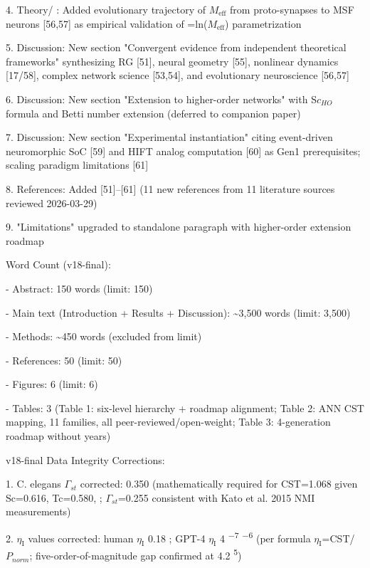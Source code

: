 \documentclass[a4paper,12pt]{article}
\begin{document}
4. Theory/ \alpha : Added evolutionary trajectory of $M_{\text{eff}}$ from proto-synapses to MSF neurons [56,57] as empirical validation of  \alpha =ln($M_{\text{eff}}$) parametrization

5. Discussion: New section "Convergent evidence from independent theoretical frameworks" synthesizing RG [51], neural geometry [55], nonlinear dynamics [17/58], complex network science [53,54], and evolutionary neuroscience [56,57]

6. Discussion: New section "Extension to higher-order networks" with S$c_{HO}$ formula and Betti number extension (deferred to companion paper)

7. Discussion: New section "Experimental instantiation" citing event-driven neuromorphic SoC [59] and HIFT analog computation [60] as Gen1 prerequisites; scaling paradigm limitations [61]

8. References: Added [51]--[61] (11 new references from 11 literature sources reviewed 2026-03-29)

9. "Limitations" upgraded to standalone paragraph with higher-order extension roadmap

Word Count (v18-final):

- Abstract: 150 words \checkmark (limit: 150)

- Main text (Introduction + Results + Discussion): \textasciitilde{}3,500 words \checkmark (limit: 3,500)

- Methods: \textasciitilde{}450 words (excluded from limit)

- References: 50 \checkmark (limit: 50)

- Figures: 6 \checkmark (limit: 6)

- Tables: 3 (Table 1: six-level hierarchy + roadmap alignment; Table 2: ANN \rightarrow CST mapping, 11 families, all peer-reviewed/open-weight; Table 3: 4-generation roadmap without years)

v18-final Data Integrity Corrections:

1. C. elegans $\Gamma_{st}$ corrected: 0.350  (mathematically required for CST=1.068 given Sc=0.616, Tc=0.580,  ; $\Gamma_{st}$=0.255 consistent with Kato et al. 2015 NMI measurements)

2. $\eta_{\text{I}}$ values corrected: human $\eta_{\text{I}}$ 0.18 ; GPT-4 $\eta_{\text{I}}$ 4 \textsuperscript{$-$}\textsuperscript{7}  \textsuperscript{$-$}\textsuperscript{6} (per formula $\eta_{\text{I}}$=CST/$P_{norm}$; five-order-of-magnitude gap confirmed at 4.2 \textsuperscript{5})
\end{document}
